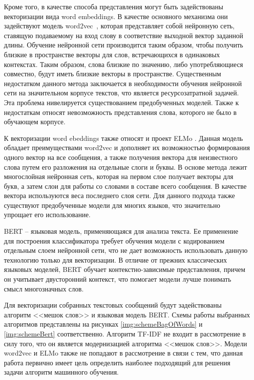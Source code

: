 Кроме того, в качестве способа представления могут быть задействованы векторизации вида word embeddings.
В качестве основного механизма они задействуют модель word2vec~\cite{word2vec}, которая представляет собой нейронную сеть, ставящую подаваемому на вход слову в соответствие выходной вектор заданной длины.
Обучение нейронной сети производится таким образом, чтобы получить близкие в пространстве векторы для слов, встречающихся в одинаковых контекстах.
Таким образом, слова близкие по значению, либо употребляющиеся совместно, будут иметь близкие векторы в пространстве.
Существенным недостатком данного метода заключается в необходимости обучения нейронной сети на значительном корпусе текстов, что является ресурсозатратной задачей.
Эта проблема нивелируется существованием предобученных моделей.
Также к недостаткам относят невозможность представления слова, которого не было в обучающем корпусе.~\cite{vectorizations}

К векторизации word ebeddings также относят и проект ELMo \cite{elmo}. Данная модель обладает преимуществами word2vec и дополняет их возможностью формирования одного вектор на все сообщения, а также получения вектора для неизвестного слова путем его разложения на отдельные слоги и буквы.
В основе метода лежит многослойная нейронная сеть, которая на первом слое получает векторы для букв, а затем слои для работы со словами в составе всего сообщения.
В качестве вектора используются веса последнего слоя сети. Для данного подхода также существуют предобученные модели для многих языков, что значительно упрощает его использование.~\cite{vectorizations}

BERT \cite{bert} -- языковая модель, применяющаяся для анализа текста. Ее применение для построения классификатора требует обучения модели с кодированием отдельным слоем нейронной сети, что не дает возможность использовать данную технологию только для векторизации.
В отличие от прежних классических языковых моделей, BERT обучает контекстно-зависимые представления, причем он учитывает двусторонний контекст, что помогает модели лучше понимать смысл многозначных слов.~\cite{vectorizations}

Для векторизации собранных текстовых сообщений будут задействованы алгоритм <<мешок слов>> и языковая модель BERT.
Схемы работы выбранных алгоритмов представлены на рисунках \ref{img:schemeBagOfWords} и \ref{img:schemeBert} соответственно.
Алгоритм TF-IDF не входит в рассмотрение в силу того, что он является модернизацией алгоритма <<мешок слов>>. 
Модели word2vec и ELMo также не попадают в рассмотрение в связи с тем, что данная работа первично имеет цель определить наиболее подходящий для решения задачи алгоритм машинного обучения.

